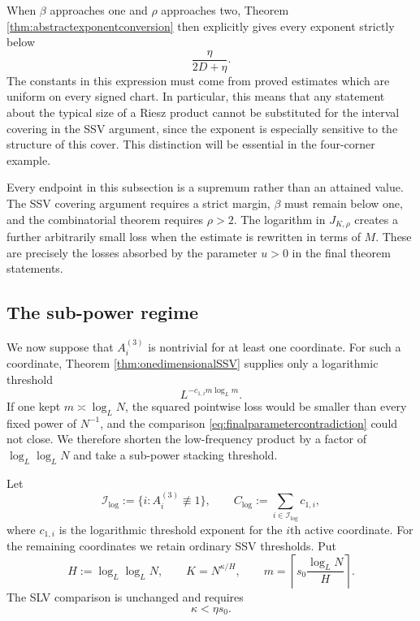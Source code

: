 \documentclass[12pt]{amsart}
\numberwithin{equation}{section}
\begin{document}
When $\beta$ approaches one and $\rho$ approaches two, Theorem
\ref{thm:abstractexponentconversion} then explicitly gives every exponent strictly below
\begin{equation}\label{eq:improvedpowerceiling}
 \frac{\eta}{2D+\eta}.
\end{equation}
The constants in this expression must come from proved estimates which are
uniform on every signed chart.  In particular, this means that any statement about the typical size of a Riesz product cannot be substituted for the interval covering in
the SSV argument, since the exponent is especially sensitive to the structure of this cover. This distinction will be essential in the four-corner
example.

Every endpoint in this subsection is a supremum rather than an attained
value.  The SSV covering argument requires a strict margin,
$\beta$ must remain below one, and the combinatorial theorem requires
$\rho>2$.  The logarithm in $J_{K,\rho}$ creates a further arbitrarily small
loss when the estimate is rewritten in terms of $M$.  These are precisely the
losses absorbed by the parameter $u>0$ in the final theorem statements.

\subsection{The sub-power regime}

We now suppose that $A_i^{(3)}$ is nontrivial for at least one coordinate.
For such a coordinate, Theorem \ref{thm:onedimensionalSSV} supplies only a
logarithmic threshold
\[
 L^{-c_{1,i}m\log_Lm}.
\]
If one kept $m\asymp\log_LN$, the squared pointwise loss would be smaller
than every fixed power of $N^{-1}$, and the comparison
\eqref{eq:finalparametercontradiction} could not close.  We therefore shorten
the low-frequency product by a factor of $\log_L\log_LN$ and take a
sub-power stacking threshold.

Let
\[
 \mathcal I_{\log}:=\{i:A_i^{(3)}\not\equiv1\},
 \qquad
 C_{\log}:=\sum_{i\in\mathcal I_{\log}}c_{1,i},
\]
where $c_{1,i}$ is the logarithmic threshold exponent for the $i$th active
coordinate.  For the remaining coordinates we retain ordinary SSV
thresholds.  Put
\[
 H:=\log_L\log_LN,
 \qquad
 K=N^{\kappa/H},
 \qquad
 m=\left\lceil s_0\frac{\log_LN}{H}\right\rceil.
\]
The SLV comparison is unchanged and requires
\begin{equation}\label{eq:log-SLV-condition}
 \kappa<\eta s_0.
\end{equation}
\end{document}
